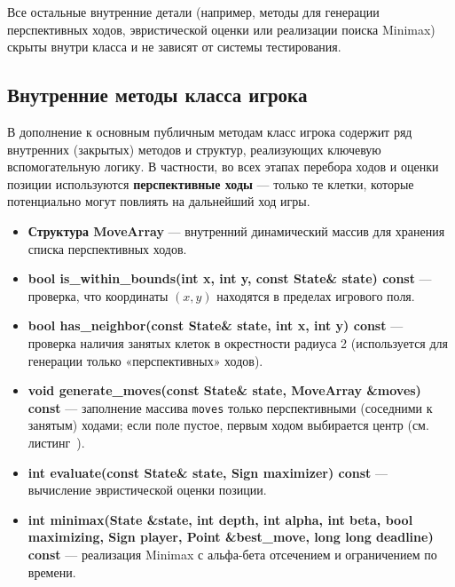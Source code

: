 \noindent Все остальные внутренние детали (например, методы для генерации перспективных ходов, эвристической оценки или реализации поиска Minimax) скрыты внутри класса и не зависят от системы тестирования.

\subsection{Внутренние методы класса игрока}

В дополнение к основным публичным методам класс игрока содержит ряд внутренних (закрытых) методов и структур, реализующих ключевую вспомогательную логику. В частности, во всех этапах перебора ходов и оценки позиции используются \textbf{перспективные ходы} — только те клетки, которые потенциально могут повлиять на дальнейший ход игры.


\begin{itemize}
    \item \textbf{Структура MoveArray} — внутренний динамический массив для хранения списка перспективных ходов.

    \item \textbf{bool is\_within\_bounds(int x, int y, const State\& state) const} — проверка, что координаты $(x, y)$ находятся в пределах игрового поля.

    \item \textbf{bool has\_neighbor(const State\& state, int x, int y) const} — проверка наличия занятых клеток в окрестности радиуса 2 (используется для генерации только «перспективных» ходов).

    \item \textbf{void generate\_moves(const State\& state, MoveArray \&moves) const} — заполнение массива \verb|moves| только перспективными (соседними к занятым) ходами; если поле пустое, первым ходом выбирается центр (см. листинг~).

    \item \textbf{int evaluate(const State\& state, Sign maximizer) const} — вычисление эвристической оценки позиции.

    \item \textbf{int minimax(State \&state, int depth, int alpha, int beta, bool maximizing, Sign player, Point \&best\_move, long long deadline) const} — реализация Minimax с альфа-бета отсечением и ограничением по времени.
\end{itemize}

\vspace{0.5em}

